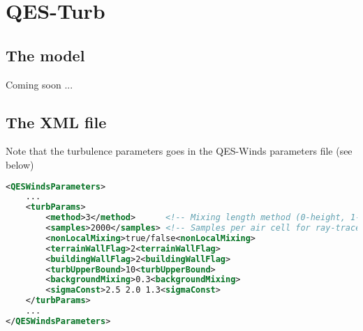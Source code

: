 \chapter{QES-Turb}



\section{The model}

Coming soon ...

\section{The XML file}

Note that the turbulence parameters goes in the QES-Winds parameters file (see below)
\begin{lstlisting}[language=XML]
<QESWindsParameters>
	...
	<turbParams>
		<method>3</method>      <!-- Mixing length method (0-height, 1-serial, 2-raytracing, 3-OptiX, 4-file) -->
		<samples>2000</samples> <!-- Samples per air cell for ray-traced mixing length calculations -->
		<nonLocalMixing>true/false<nonLocalMixing>
		<terrainWallFlag>2<terrainWallFlag>
		<buildingWallFlag>2<buildingWallFlag>
		<turbUpperBound>10<turbUpperBound>
		<backgroundMixing>0.3<backgroundMixing>
		<sigmaConst>2.5 2.0 1.3<sigmaConst>
	</turbParams>							
	...
</QESWindsParameters>
\end{lstlisting}
